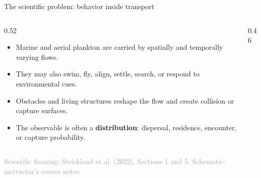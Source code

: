\documentclass[aspectratio=169,11pt]{beamer}
\newcommand{\sourcecredit}[1]{\vfill\begin{flushright}\tiny\textcolor{DarkGray}{#1}\end{flushright}}
\begin{document}
\begin{frame}{The scientific problem: behavior inside transport}
\begin{columns}[T,onlytextwidth]
  \begin{column}{0.52\textwidth}
    \begin{itemize}
      \item Marine and aerial plankton are carried by spatially and temporally varying flows.
      \item They may also swim, fly, align, settle, search, or respond to environmental cues.
      \item Obstacles and living structures reshape the flow and create collision or capture surfaces.
      \item The observable is often a \textbf{distribution}: dispersal, residence, encounter, or capture probability.
    \end{itemize}
  \end{column}
  \begin{column}{0.46\textwidth}
    \centering
  \end{column}
\end{columns}
\sourcecredit{Scientific framing: Strickland et al. (2022), Sections 1 and 5. Schematic: instructor's course notes.}
\end{frame}
\end{document}
